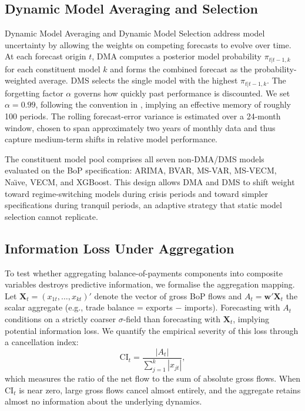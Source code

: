 \documentclass[12pt,a4paper]{article}
\begin{document}
\subsection{Dynamic Model Averaging and Selection}

Dynamic Model Averaging and Dynamic Model Selection \citep{Raftery2010,KoopKorobilis2012} address model uncertainty by allowing the weights on competing forecasts to evolve over time. At each forecast origin $t$, DMA computes a posterior model probability $\pi_{t|t-1,k}$ for each constituent model $k$ and forms the combined forecast as the probability-weighted average. DMS selects the single model with the highest $\pi_{t|t-1,k}$. The forgetting factor $\alpha$ governs how quickly past performance is discounted. We set $\alpha = 0.99$, following the convention in \cite{KoopKorobilis2012}, implying an effective memory of roughly 100 periods. The rolling forecast-error variance is estimated over a 24-month window, chosen to span approximately two years of monthly data and thus capture medium-term shifts in relative model performance.

The constituent model pool comprises all seven non-DMA/DMS models evaluated on the BoP specification: ARIMA, BVAR, MS-VAR, MS-VECM, Na\"{\i}ve, VECM, and XGBoost. This design allows DMA and DMS to shift weight toward regime-switching models during crisis periods and toward simpler specifications during tranquil periods, an adaptive strategy that static model selection cannot replicate.

\subsection{Information Loss Under Aggregation}

To test whether aggregating balance-of-payments components into composite variables destroys predictive information, we formalise the aggregation mapping. Let $\mathbf{X}_t = (x_{1t}, \ldots, x_{kt})'$ denote the vector of gross BoP flows and $A_t = \mathbf{w}'\mathbf{X}_t$ the scalar aggregate (e.g., trade balance = exports $-$ imports). Forecasting with $A_t$ conditions on a strictly coarser $\sigma$-field than forecasting with $\mathbf{X}_t$, implying potential information loss. We quantify the empirical severity of this loss through a cancellation index:
\[
\text{CI}_t = \frac{|A_t|}{\sum_{j=1}^{k} |x_{jt}|},
\]
which measures the ratio of the net flow to the sum of absolute gross flows. When $\text{CI}_t$ is near zero, large gross flows cancel almost entirely, and the aggregate retains almost no information about the underlying dynamics.
\end{document}
